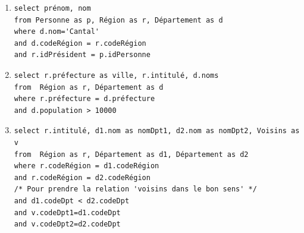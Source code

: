 \begin{solution}


\begin{enumerate}
  \item 
\begin{verbatim}
select prénom, nom
from Personne as p, Région as r, Département as d
where d.nom='Cantal'
and d.codeRégion = r.codeRégion
and r.idPrésident = p.idPersonne
\end{verbatim}

  \item 
\begin{verbatim}
select r.préfecture as ville, r.intitulé, d.noms
from  Région as r, Département as d
where r.préfecture = d.préfecture
and d.population > 10000
\end{verbatim}


  \item 
\begin{verbatim}
select r.intitulé, d1.nom as nomDpt1, d2.nom as nomDpt2, Voisins as v
from  Région as r, Département as d1, Département as d2
where r.codeRégion = d1.codeRégion
and r.codeRégion = d2.codeRégion
/* Pour prendre la relation 'voisins dans le bon sens' */
and d1.codeDpt < d2.codeDpt
and v.codeDpt1=d1.codeDpt
and v.codeDpt2=d2.codeDpt
\end{verbatim}

\end{enumerate}
\end{solution}
